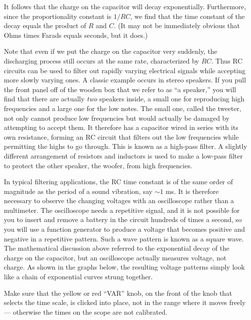 It follows that the charge on the capacitor will decay
exponentially. Furthermore, since the proportionality
constant is $1/RC$, we find that the time constant of the
decay equals the product of $R$ and $C$. (It may not be
immediately obvious that Ohms times Farads equals seconds, but it does.)

Note that even if we put the charge on the capacitor very
suddenly, the discharging process still occurs at the same
rate, characterized by $RC$. Thus RC circuits can be used to
filter out rapidly varying electrical signals while
accepting more slowly varying ones. A classic example occurs
in stereo speakers. If you pull the front panel off of the
wooden box that we refer to as ``a speaker,'' you will find
that there are actually \emph{two} speakers inside, a small
one for reproducing high frequencies and a large one for the
low notes. The small one, called the tweeter, not only
cannot produce low frequencies but would actually be damaged
by attempting to accept them. It therefore has a capacitor
wired in series with its own resistance, forming an RC
circuit that filters out the low frequencies while
permitting the highs to go through. This is known as a
high-pass filter. A slightly different arrangement of
resistors and inductors is used to make a low-pass filter
to protect the other speaker, the woofer, from high frequencies. 

\observations


In typical filtering applications, the RC time constant is
of the same order of magnitude as the period of a sound
vibration, say $\sim1$ ms. It is therefore necessary to
observe the changing voltages with an oscilloscope rather
than a multimeter. The oscilloscope needs a repetitive
signal, and it is not possible for you to insert and remove
a battery in the circuit hundreds of times a second, so you
will use a function generator to produce a voltage that
becomes positive and negative in a repetitive pattern. Such
a wave pattern is known as a square wave. The mathematical
discussion above referred to the exponential decay of the
charge on the capacitor, but an oscilloscope actually
measures voltage, not charge. As shown in the graphs below,
the resulting voltage patterns simply look like a chain of
exponential curves strung together.



Make sure that the yellow or red ``VAR'' knob, on the front of the
knob that selects the time scale, is clicked into place, not
in the range where it moves freely --- otherwise the times
on the scope are not calibrated.

